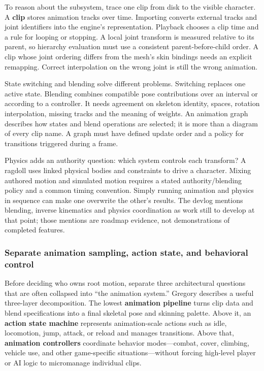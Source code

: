 To reason about the subsystem, trace one clip from disk to the visible character. A \textbf{clip} stores animation tracks over time. Importing converts external tracks and joint identifiers into the engine's representation. Playback chooses a clip time and a rule for looping or stopping. A local joint transform is measured relative to its parent, so hierarchy evaluation must use a consistent parent-before-child order. A clip whose joint ordering differs from the mesh's skin bindings needs an explicit remapping. Correct interpolation on the wrong joint is still the wrong animation.

State switching and blending solve different problems. Switching replaces one active state. Blending combines compatible pose contributions over an interval or according to a controller. It needs agreement on skeleton identity, spaces, rotation interpolation, missing tracks and the meaning of weights. An animation graph describes how states and blend operations are selected; it is more than a diagram of every clip name. A graph must have defined update order and a policy for transitions triggered during a frame.

Physics adds an authority question: which system controls each transform? A ragdoll uses linked physical bodies and constraints to drive a character. Mixing authored motion and simulated motion requires a stated authority/blending policy and a common timing convention. Simply running animation and physics in sequence can make one overwrite the other's results. The devlog mentions blending, inverse kinematics and physics coordination as work still to develop at that point; those mentions are roadmap evidence, not demonstrations of completed features.

\subsubsection{Separate animation sampling, action state, and behavioral control}\label{06-engine-ii-ch040-separate-animation-sampling-action-state-and-behavioral-control}

\hypertarget{06-engine-ii-ch040-separate-animation-sampling-action-state-and-behavioral-control}{}

Before deciding who owns root motion, separate three architectural questions that are often collapsed into ``the animation system.'' Gregory describes a useful three-layer decomposition. The lowest \textbf{animation pipeline} turns clip data and blend specifications into a final skeletal pose and skinning palette. Above it, an \textbf{action state machine} represents animation-scale actions such as idle, locomotion, jump, attack, or reload and manages transitions. Above that, \textbf{animation controllers} coordinate behavior modes---combat, cover, climbing, vehicle use, and other game-specific situations---without forcing high-level player or AI logic to micromanage individual clips.

